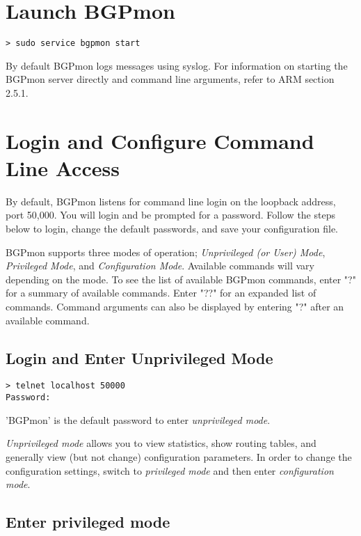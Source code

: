 \documentclass{article}
\begin{document}
\section{Launch BGPmon}
\label{sec:launch}
\begin{Verbatim}[frame=single]
> sudo service bgpmon start 
\end{Verbatim}

By default BGPmon logs messages using syslog.
For information on starting the BGPmon server directly and command line arguments, refer to ARM section 2.5.1.

\section{Login and Configure Command Line Access}
\label{sec:login}
By default, BGPmon listens for command line login on the loopback address, port 50,000.   You will login and be prompted for a password.  Follow the steps below to login, change the default passwords, and save your configuration file.  

BGPmon supports three modes of operation;   \emph{Unprivileged (or User) Mode}, \emph{Privileged Mode},  and \emph{Configuration Mode}.   Available commands will vary depending on the mode.   To see the list of available BGPmon commands, enter "?" for a summary of available commands. Enter "??" for an expanded list of commands. Command arguments can also be displayed by entering "?" after an available command.    

\subsection{Login and Enter Unprivileged Mode}
\begin{Verbatim}[frame=single]
> telnet localhost 50000
Password:
\end{Verbatim}

'BGPmon' is the default password to enter \emph{unprivileged mode}.  

\emph{Unprivileged mode} allows you to view statistics, show routing tables, and generally view (but not change) configuration parameters. In order to change the configuration settings, switch to \emph{privileged mode} and then enter \emph{configuration mode}.

\subsection{Enter privileged mode}
\end{document}
